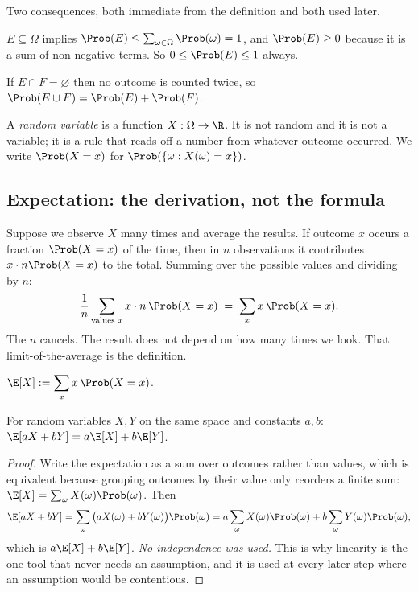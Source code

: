 Two consequences, both immediate from the definition and both used later.

$E \subseteq \Omega$ implies $\Prob(E) \le \sum_{\omega\in\Omega}\Prob(\omega) = 1$,
and $\Prob(E) \ge 0$ because it is a sum of non-negative terms. So
$0 \le \Prob(E) \le 1$ always.

If $E \cap F = \varnothing$ then no outcome is counted twice, so
$\Prob(E \cup F) = \Prob(E) + \Prob(F)$.

\begin{definition}
A \emph{random variable} is a function $X : \Omega \to \R$. It is not random and
it is not a variable; it is a rule that reads off a number from whatever outcome
occurred. We write $\Prob(X = x)$ for $\Prob(\{\omega : X(\omega) = x\})$.
\end{definition}

\subsection{Expectation: the derivation, not the formula}

Suppose we observe $X$ many times and average the results. If outcome $x$ occurs
a fraction $\Prob(X=x)$ of the time, then in $n$ observations it contributes
$x \cdot n\Prob(X=x)$ to the total. Summing over the possible values and dividing
by $n$:
\begin{equation}
\frac{1}{n}\sum_{\text{values } x} x \cdot n\,\Prob(X=x)
  \;=\; \sum_{x} x\,\Prob(X=x).
\end{equation}
The $n$ cancels. The result does not depend on how many times we look. That
limit-of-the-average is the definition.

\begin{definition}[Expectation]
$\displaystyle \E[X] := \sum_{x} x\,\Prob(X = x)$.
\end{definition}

\begin{lemma}[Linearity]
\label{lem:lin}
For random variables $X,Y$ on the same space and constants $a,b$:
$\E[aX + bY] = a\E[X] + b\E[Y]$.
\end{lemma}

\begin{proof}
Write the expectation as a sum over outcomes rather than values, which is
equivalent because grouping outcomes by their value only reorders a finite sum:
$\E[X] = \sum_{\omega} X(\omega)\Prob(\omega)$. Then
\[
\E[aX+bY] = \sum_\omega \big(aX(\omega)+bY(\omega)\big)\Prob(\omega)
 = a\sum_\omega X(\omega)\Prob(\omega) + b\sum_\omega Y(\omega)\Prob(\omega),
\]
which is $a\E[X]+b\E[Y]$. \emph{No independence was used.} This is why linearity
is the one tool that never needs an assumption, and it is used at every later
step where an assumption would be contentious.
\end{proof}

